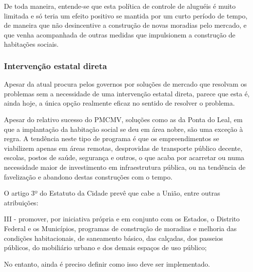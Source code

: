 \documentclass[
	12pt,				%
	oneside,			%
	a4paper,			%
	chapter=TITLE,		%
	section=TITLE,		%
	english,			%
	brazil				%
	]{abntex2}
\begin{document}
De toda maneira, entende-se que esta política de controle de aluguéis é muito
limitada e só teria um efeito positivo se mantida por um curto período de tempo,
de maneira que não desincentive a construção de novas moradias pelo mercado, e
que venha acompanhada de outras medidas que impulsionem a construção de
habitações sociais.

\hypertarget{intervenuxe7uxe3o-estatal-direta}{%
\subsubsection{Intervenção estatal direta}\label{intervenuxe7uxe3o-estatal-direta}}

Apesar da atual procura pelos governos por soluções de mercado que resolvam os
problemas sem a necessidade de uma intervenção estatal direta, parece que esta
é, ainda hoje, a única opção realmente eficaz no sentido de resolver o problema.

Apesar do relativo sucesso do \gls{PMCMV}, soluções como as da Ponta do Leal, em
que a implantação da habitação social se deu em área nobre, são uma exceção à
regra. A tendência neste tipo de programa é que os empreendimentos se viabilizem
apenas em áreas remotas, desprovidas de transporte público decente, escolas,
postos de saúde, segurança e outros, o que acaba por acarretar ou numa
necessidade maior de investimento em infraestrutura pública, ou na tendência de
favelização e abandono destas construções com o tempo.

O artigo 3º do Estatuto da Cidade prevê que cabe a União, entre outras
atribuições:
\begin{citacao}
III - promover, por iniciativa própria e em conjunto com os Estados, o Distrito
Federal e os Municípios, programas de construção de moradias e melhoria das
condições habitacionais, de saneamento básico, das calçadas, dos passeios
públicos, do mobiliário urbano e dos demais espaços de uso público;
\end{citacao}
No entanto, ainda é preciso definir como isso deve ser implementado.
\end{document}
